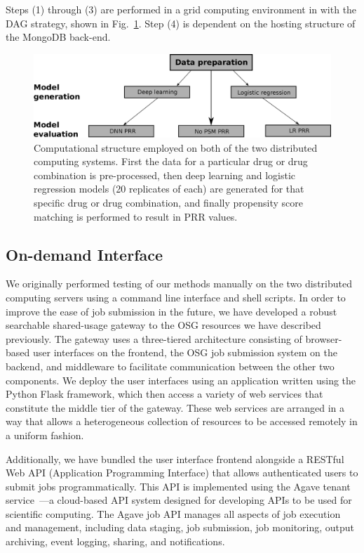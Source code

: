 \documentclass{ws-procs11x85}
\begin{document}
Steps (1) through (3) are performed in a grid computing environment in
with the DAG strategy, shown in Fig.~\ref{fig:dag}.  Step (4) is
dependent on the hosting structure of the MongoDB back-end.

\begin{figure}[h]
\centerline{\includegraphics[width=\textwidth]{dag}}
\caption{Computational structure employed on both of the two distributed computing
  systems. First the data for a particular drug or drug combination is
  pre-processed, then deep learning and logistic regression models (20 replicates of each)
  are generated for that specific drug or drug combination, and finally
  propensity score matching is performed to result in PRR values.}
\label{fig:dag}
\end{figure}


\subsection{On-demand Interface}
We originally performed testing of our methods manually on the two
distributed computing servers using a command line interface and shell
scripts. In order to improve the ease of job submission in the future,
we have developed a robust searchable shared-usage gateway to the OSG
resources we have described previously. The gateway uses a
three-tiered architecture consisting of browser-based user interfaces
on the frontend, the OSG job submission system on the backend, and
middleware to facilitate communication between the other two
components. We deploy the user interfaces using an application written
using the Python Flask framework, which then access a variety of web
services that constitute the middle tier of the gateway. These web
services are arranged in a way that allows a heterogeneous collection
of resources to be accessed remotely in a uniform fashion.

Additionally, we have bundled the user interface frontend alongside a
RESTful Web API (Application Programming Interface) that allows
authenticated users to submit jobs programmatically. This API is
implemented using the Agave tenant service~\cite{dooley2012agave}---a
cloud-based API system designed for developing APIs to be used for
scientific computing. The Agave job API manages all aspects of job
execution and management, including data staging, job submission, job
monitoring, output archiving, event logging, sharing, and
notifications.
\end{document}
